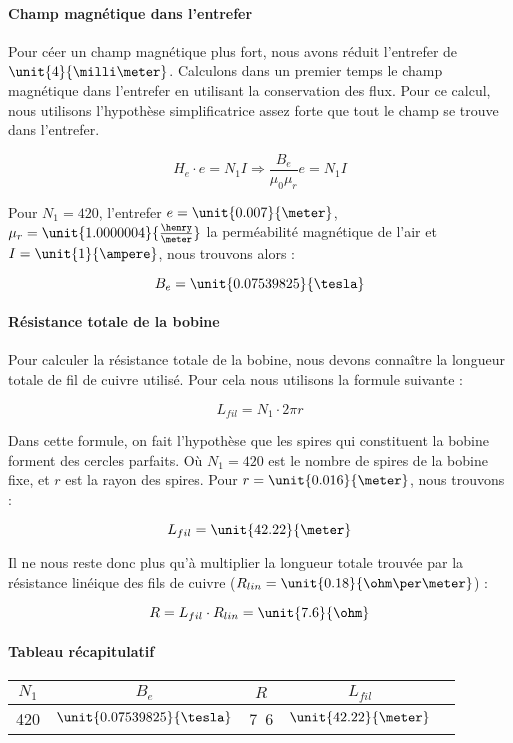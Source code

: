 \paragraph{Champ magnétique dans l'entrefer}
Pour céer un champ magnétique plus fort, nous avons réduit l'entrefer de $\unit{4}{\milli\meter}$.
Calculons dans un premier temps le champ magnétique dans l'entrefer en 
utilisant la conservation des flux. Pour ce calcul, nous utilisons l'hypothèse simplificatrice
assez forte que tout le champ se trouve dans l'entrefer.

$$H_e \cdot e = N_1 I \Rightarrow \frac{B_e}{\mu_0 \mu_r} e = N_1 I$$

Pour $N_1 = 420$, l'entrefer $e = \unit{0.007}{\meter}$, $\mu_r = \unit{1.0000004}{\frac{\henry}{\meter}}$ la perméabilité magnétique
de l'air et $I = \unit{1}{\ampere}$, nous trouvons alors :

$$B_e = \unit{0.07539825}{\tesla}$$

\paragraph{Résistance totale de la bobine}
Pour calculer la résistance totale de la bobine, nous devons connaître la longueur totale de fil de cuivre utilisé.
Pour cela nous utilisons la formule suivante :

$$L_{fil} = N_1 \cdot 2\pi r$$  

Dans cette formule, on fait l'hypothèse que les spires qui constituent la bobine forment des cercles
parfaits.
Où $N_1 = 420$ est le nombre de spires de la bobine fixe, et $r$ est la rayon des spires. Pour
$r = \unit{0.016}{\meter}$, nous trouvons :

$$L_{fil} = \unit{42.22}{\meter}$$

Il ne nous reste donc plus qu'à multiplier la longueur totale trouvée par la résistance linéique des fils de cuivre
($R_{lin} = \unit{0.18}{\ohm\per\meter}$) :

$$R = L_{fil} \cdot R_{lin} = \unit{7.6}{\ohm}$$


\paragraph{Tableau récapitulatif}

\begin{center}
	\begin{tabular}{c|c|c|c|c}
		$N_1$ & $B_e$ & $R$ & $L_{fil}$ \\
		\hline
		420 & $\unit{0.07539825}{\tesla}$ & \unit{7.6}{\ohm} &  $\unit{42.22}{\meter}$\\
	\end{tabular}
\end{center}

